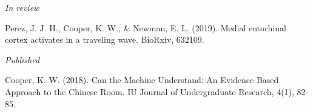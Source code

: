 \begin{cvpubentries}


\iffalse
  \cvpubentry
    {\textit{In preparation}} %
    { } %
    { } %
    { } %
    {
      \begin{cvpubitems} %
        \item { Paper goes here }
      \end{cvpubitems}
    }
\fi

\iftrue
  \cvpubentry
    {\textit{In review}} %
    { } %
    { } %
    { } %
    {
      \begin{cvpubitems} %
        \item {Perez, J. J. H., Cooper, K. W., \& Newman, E. L. (2019). Medial entorhinal cortex activates in a traveling wave. BioRxiv, 632109. }
      \end{cvpubitems}
    }
\fi

\iffalse
  \cvpubentry
    {\textit{In press}} %
    {} %
    {} %
    {} %
    {
      \begin{cvpubitems} %
        \item {pub}
      \end{cvpubitems}
    }
\fi

  \cvpubentry
    {\textit{Published}} %
    {} %
    {} %
    {} %
    {
      \begin{cvpubitems} %
        \item {Cooper, K. W. (2018). Can the Machine Understand: An Evidence Based Approach to the Chinese Room. IU Journal of Undergraduate Research, 4(1), 82-85.}
      \end{cvpubitems}
    }
\iffalse %
\fi


\end{cvpubentries}
